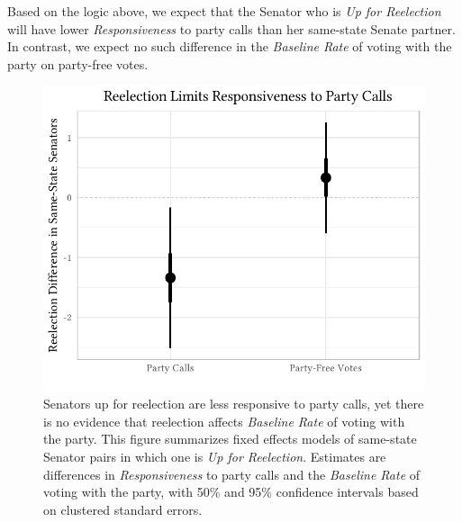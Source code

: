 \documentclass[12pt]{article}
\begin{document}
Based on the logic above, we expect that the Senator who is \textit{Up for Reelection} will have lower \textit{Responsiveness} to party calls than her same-state Senate partner.  In contrast, we expect no such difference in the \textit{Baseline Rate} of voting with the party on party-free votes.

\begin{figure}[t]
\centering
\includegraphics[width = 12cm]{senate_difference_estimates.pdf}

\caption{Senators up for reelection are less responsive to party calls, yet there is no evidence that reelection affects \textit{Baseline Rate} of voting with the party.  This figure summarizes fixed effects models of same-state Senator pairs in which one is \textit{Up for Reelection}.  Estimates are differences in \textit{Responsiveness} to party calls and the \textit{Baseline Rate} of voting with the party, with 50\% and 95\% confidence intervals based on clustered standard errors.
\label{fig-reelection-responsiveness}}
\end{figure}
\end{document}
